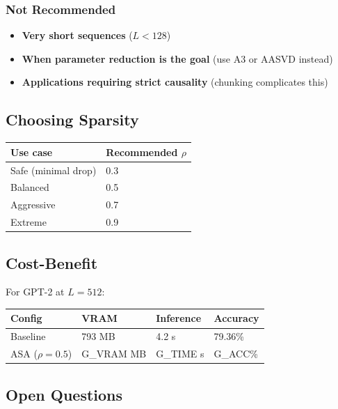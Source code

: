 \subsubsection{Not Recommended}

\begin{itemize}
\item \textbf{Very short sequences} ($L < 128$)
\item \textbf{When parameter reduction is the goal} (use A3 or AASVD instead)
\item \textbf{Applications requiring strict causality} (chunking complicates this)

\end{itemize}
\subsection{Choosing Sparsity}

\begin{table}[H]
\centering
\small
\begin{tabular}{ll}
\toprule
\textbf{Use case} & \textbf{Recommended $\rho$} \\
\midrule
Safe (minimal drop) & 0.3 \\
Balanced & 0.5 \\
Aggressive & 0.7 \\
Extreme & 0.9 \\
\bottomrule
\end{tabular}
\end{table}

\subsection{Cost-Benefit}

For GPT-2 at $L = 512$:

\begin{table}[H]
\centering
\small
\begin{tabular}{llll}
\toprule
\textbf{Config} & \textbf{VRAM} & \textbf{Inference} & \textbf{Accuracy} \\
\midrule
Baseline & 793 MB & 4.2 s & 79.36\% \\
ASA ($\rho=0.5$) & {{G\_VRAM}} MB & {{G\_TIME}} s & {{G\_ACC}}\% \\
\bottomrule
\end{tabular}
\end{table}

\subsection{Open Questions}

